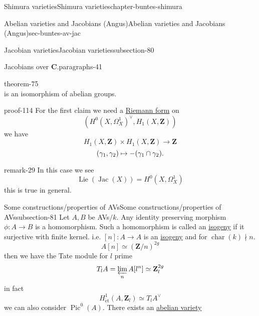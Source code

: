 \documentclass[oneside,10pt,]{book}
\renewcommand{\qedhere}{\relax}
\numberwithin{equation}{section}
\newcommand{\Lie}{\operatorname{Lie}}
\newcommand{\lb}{[}
\newcommand{\rb}{]}
\newcommand{\ZZ}{\mathbf{Z}}
\newcommand{\CC}{\mathbf{C}}
\newcommand{\et}{\mathrm{\acute{e}t}}
\DeclareMathOperator{\Pic}{Pic}
\DeclareMathOperator{\Jac}{Jac}
\DeclareMathOperator{\characteristic}{char}
\begin{document}
\begin{chapterptx}{Shimura varieties}{}{Shimura varieties}{}{}{chapter-buntes-shimura}
\begin{sectionptx}{Abelian varieties and Jacobians (Angus)}{}{Abelian varieties and Jacobians (Angus)}{}{}{sec-buntes-av-jac}
\begin{subsectionptx}{Jacobian varieties}{}{Jacobian varieties}{}{}{subsection-80}
\begin{paragraphs}{Jacobians over \(\CC\).}{paragraphs-41}
\begin{theorem}{}{}{theorem-75}
\begin{equation*}
\end{equation*}
is an isomorphism of abelian groups.%
\end{theorem}
\begin{proofptx}{}{proof-114}
\hypertarget{p-1108}{}%
For the first claim we need a \hyperref[def-riemann-form]{Riemann form} on%
\begin{equation*}
(H^0(X, \Omega_X^1)^\vee , H_1(X,\ZZ))
\end{equation*}
we have%
\begin{equation*}
H_1(X, \ZZ) \times H_1(X, \ZZ) \to \ZZ
\end{equation*}
%
\begin{equation*}
(\gamma_1, \gamma_2) \mapsto -(\gamma_1\cap \gamma_2)\text{.}\qedhere
\end{equation*}
%
\end{proofptx}
\begin{remark}{}{remark-29}%
\hypertarget{p-1109}{}%
In this case we see%
\begin{equation*}
\Lie(\Jac(X)) = H^0(X, \Omega_X^1)
\end{equation*}
this is true in general.%
\end{remark}
\end{paragraphs}%
\end{subsectionptx}
%
%
\typeout{************************************************}
\typeout{************************************************}
%
\begin{subsectionptx}{Some constructions/properties of AVs}{}{Some constructions/properties of AVs}{}{}{subsection-81}
\hypertarget{p-1110}{}%
Let \(A,B\) be AVs\(/k\). Any identity preserving morphism \(\phi \colon A \to B\) is a homomorphism. Such a homomorphism is called an \hyperref[def-supersing-isog-isog]{isogeny} if it surjective with finite kernel. i.e. \(\lb n \rb \colon A \to A\) is an \hyperref[def-supersing-isog-isog]{isogeny} and for \(\characteristic(k) \nmid n\).%
\begin{equation*}
A[n] \simeq (\ZZ/n)^{2g}
\end{equation*}
then we have the Tate module for \(l\) prime%
\begin{equation*}
T_lA = \varprojlim_n A[l^n] \simeq \ZZ_l^{2g}
\end{equation*}
in fact%
\begin{equation*}
H^1_{\et} (A, \ZZ_l) \simeq T_lA ^\vee
\end{equation*}
we can also consider \(\Pic^0(A)\). There exists an \hyperref[def-buntes-abvar]{abelian variety}%

\end{subsectionptx}
\end{sectionptx}
\end{chapterptx}
\end{document}
